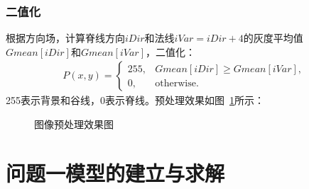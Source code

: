 \documentclass{whutmod}
\begin{document}
            \subsubsection{二值化}
                根据方向场，计算脊线方向$iDir$和法线$iVar = iDir + 4$的灰度平均值$Gmean[iDir]$和$Gmean[iVar]$，二值化：
                \begin{gather*}
                    P(x,y) = \begin{cases}
                        255, & Gmean[iDir] \geqslant Gmean[iVar], \\
                        0, & \text{otherwise}.
                    \end{cases}
                \end{gather*}
                255表示背景和谷线，0表示脊线。预处理效果如图~\ref{zhiwesn}所示：

                \begin{figure}[H]
                    \centering
                    \caption{图像预处理效果图}\label{zhiwesn}
                \end{figure}

    \section{问题一模型的建立与求解}
\end{document}
